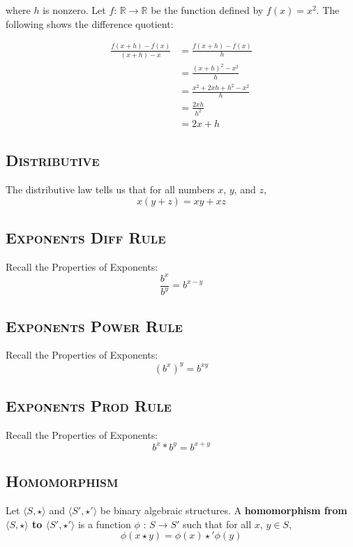 \documentclass{article}
\begin{document}
where $h$ is nonzero. Let $f$: $\mathbb{R}\rightarrow\mathbb{R}$ be the function defined by $f(x) = x^2$. The following shows the difference quotient:

\begin{align*}
    \frac{f(x + h) - f(x)}{(x + h)-x} &= \frac{f(x + h) - f(x)}{h}\\
    &= \frac{(x + h)^2 - x^2}{h}\\
    &= \frac{x^2 + 2xh + h^2 - x^2}{h}\\
    &= \frac{2xh}{h^2} \\
    &= 2x + h
\end{align*}

\subsection{\textsc{Distributive}}
The distributive law tells us that for all numbers $x$, $y$, and $z$,\begin{equation*}x(y+z) = xy + xz
\end{equation*}
\subsection{\textsc{Exponents Diff Rule}}
Recall the Properties of Exponents:\begin{equation*}
\frac{b^x}{b^y} = b^{x-y}
\end{equation*}
\subsection{\textsc{Exponents Power Rule}}
Recall the Properties of Exponents:\begin{equation*}
(b^x)^y = b^{xy}
\end{equation*}
\subsection{\textsc{Exponents Prod Rule}}
Recall the Properties of Exponents:\begin{equation*}
b^x * b^y = b^{x+y}
\end{equation*}
\subsection{\textsc{Homomorphism}}
Let $\langle S,\star\rangle$ and $\langle S',\star'\rangle$ be binary algebraic structures. A \textbf{homomorphism from $\langle S,\star\rangle$ to $\langle S',\star'\rangle$} is a function $\phi$ : $S\rightarrow S'$ such that for all $x$, $y\in S$,\begin{equation*}
\phi(x\star y) = \phi(x) \star'\phi(y)
\end{equation*}
\end{document}
